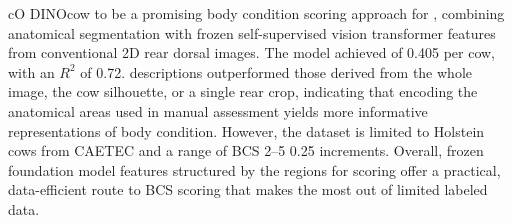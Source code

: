 \begin{marca}{cO}
DINOcow  to be a promising body condition scoring approach for , combining anatomical segmentation with frozen self-supervised vision transformer features from conventional 2D rear dorsal images.
The model achieved  of 0.405 per cow, with an $R^2$ of 0.72.
 descriptions outperformed those derived from the whole image, the cow silhouette, or a single rear crop, indicating that encoding the anatomical areas used in manual assessment yields more informative representations of body condition.
However, the dataset is limited to Holstein cows from CAETEC and a range of BCS 2--5  0.25 increments.
Overall, frozen foundation model features structured by the  regions  for scoring offer a practical, data-efficient route to BCS scoring that makes the most out of limited labeled data.
\end{marca}
